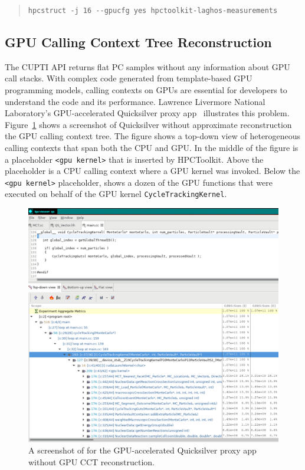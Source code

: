 \begin{quote}
\begin{verbatim}
hpcstruct -j 16 --gpucfg yes hpctoolkit-laghos-measurements
\end{verbatim}
\end{quote}


\subsection{GPU Calling Context Tree Reconstruction}
\label{nvidia-cct}



The CUPTI API returns flat PC samples without any information about GPU call stacks.
With complex code generated from template-based GPU programming models, calling contexts on GPUs are essential for developers to understand the code and its performance. Lawrence Livermore National Laboratory's GPU-accelerated Quicksilver proxy app~\cite{quicksilver} illustrates this problem. Figure~\ref{qs-no-cct} shows a \hpcviewer{} screenshot of Quicksilver without approximate reconstruction the GPU calling context tree. The figure shows a top-down view of heterogeneous calling contexts that span both the CPU and GPU. In the middle of the figure is a placeholder \verb|<gpu kernel>| that is inserted by HPCToolkit. Above the placeholder is a CPU calling context where a GPU kernel was invoked. Below the \verb|<gpu kernel>| placeholder, \hpcviewer{} shows a dozen of the GPU functions that were executed on behalf of the GPU kernel \verb|CycleTrackingKernel|. 

\begin{figure}[t]
\centering
\includegraphics[width=\textwidth]{qs-no-cct.pdf}
\caption{A screenshot of \hpcviewer{} for the GPU-accelerated Quicksilver proxy app without GPU CCT reconstruction.}
\label{qs-no-cct}
\end{figure}


